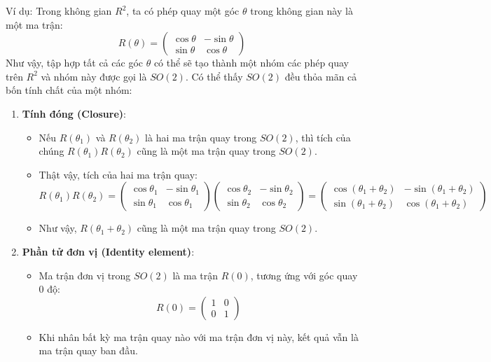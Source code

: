 Ví dụ: Trong không gian $R^2$, ta có phép quay một góc $\theta$ trong không gian này là một ma trận:
$$
R(\theta) = \begin{pmatrix}
\cos{\theta} & -\sin{\theta} \\
\sin{\theta} & \cos{\theta}
\end{pmatrix}
$$
Như vậy, tập hợp tất cả các góc $\theta$ có thể sẽ tạo thành một nhóm các phép quay trên $R^2$ và nhóm này được gọi là $SO(2)$. Có thể thấy $SO(2)$ đều thỏa mãn cả bốn tính chất của một nhóm:
\begin{enumerate}
    \item \textbf{Tính đóng (Closure)}:
    \begin{itemize}
        \item Nếu \(R(\theta_1)\) và \(R(\theta_2)\) là hai ma trận quay trong \(SO(2)\), thì tích của chúng \(R(\theta_1)R(\theta_2)\) cũng là một ma trận quay trong \(SO(2)\).
        \item Thật vậy, tích của hai ma trận quay:
        \[
        R(\theta_1)R(\theta_2) = \begin{pmatrix}
        \cos{\theta_1} & -\sin{\theta_1} \\
        \sin{\theta_1} & \cos{\theta_1}
        \end{pmatrix}
        \begin{pmatrix}
        \cos{\theta_2} & -\sin{\theta_2} \\
        \sin{\theta_2} & \cos{\theta_2}
        \end{pmatrix}
        = \begin{pmatrix}
        \cos(\theta_1 + \theta_2) & -\sin(\theta_1 + \theta_2) \\
        \sin(\theta_1 + \theta_2) & \cos(\theta_1 + \theta_2)
        \end{pmatrix}
        \]
        \item Như vậy, \(R(\theta_1 + \theta_2)\) cũng là một ma trận quay trong \(SO(2)\).
    \end{itemize}
    
    \item \textbf{Phần tử đơn vị (Identity element)}:
    \begin{itemize}
        \item Ma trận đơn vị trong \(SO(2)\) là ma trận \(R(0)\), tương ứng với góc quay 0 độ:
        \[
        R(0) = \begin{pmatrix}
        1 & 0 \\
        0 & 1
        \end{pmatrix}
        \]
        \item Khi nhân bất kỳ ma trận quay nào với ma trận đơn vị này, kết quả vẫn là ma trận quay ban đầu.
    \end{itemize}


\end{enumerate}
